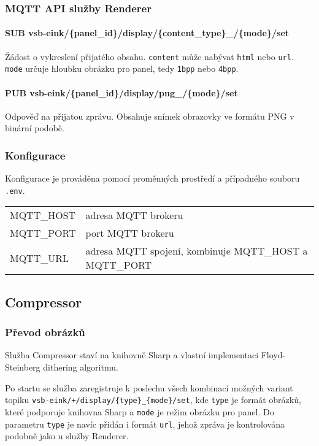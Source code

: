 \subsubsection{MQTT API služby Renderer}
\paragraph*{SUB vsb-eink/\{panel\_id\}/display/\{content\_type\}\_/\{mode\}/set} Žádost o vykreslení přijatého obsahu. \lstinline|content| může nabývat \lstinline|html| nebo \lstinline|url|. \lstinline|mode| určuje hloubku obrázku pro panel, tedy \lstinline|1bpp| nebo \lstinline|4bpp|.

\paragraph*{PUB vsb-eink/\{panel\_id\}/display/png\_/\{mode\}/set} Odpověď na přijatou zprávu. Obsahuje snímek obrazovky ve formátu PNG v binární podobě.

\subsubsection{Konfigurace}
Konfigurace je prováděna pomocí proměnných prostředí a případného souboru \lstinline{.env}.
\begin{table}[h]
    \begin{tabular}{ll}
        MQTT\_HOST & adresa MQTT brokeru \\
        MQTT\_PORT & port MQTT brokeru \\
        MQTT\_URL & adresa MQTT spojení, kombinuje MQTT\_HOST a MQTT\_PORT \\
    \end{tabular}
\end{table}

\subsection{Compressor}
\subsubsection{Převod obrázků}
Služba Compressor staví na knihovně Sharp \cite{fullerLovellSharp2024} a vlastní implementaci Floyd-Steinberg dithering algoritmu.

Po startu se služba zaregistruje k poslechu všech kombinací možných variant topiku \lstinline|vsb-eink/+/display/{type}_{mode}/set|, kde \lstinline|type| je formát obrázků, které podporuje knihovna Sharp a \lstinline|mode| je režim obrázku pro panel. Do parametru \lstinline|type| je navíc přidán i formát \lstinline|url|, jehož zpráva je kontrolována podobně jako u služby Renderer.

